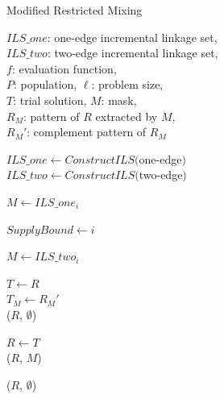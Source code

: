 \documentclass{sig-alternate-05-2015}
\begin{document}
\begin{algorithm}[th!]
\caption{Modified Restricted Mixing}\label{algo_disjdecomp}

$ILS\_one$: one-edge incremental linkage set,\\
$ILS\_two$: two-edge incremental linkage set,\\
$f$: evaluation function, \\
$P$: population, $\ell$: problem size, \\
$T$: trial solution, $M$: mask, \\
${R_M}$: pattern of $R$ extracted by $M$, \\
${R_M}'$: complement pattern of ${R_M}$



\BlankLine
$ILS\_one  \leftarrow ConstructILS($one-edge$)$\\
$ILS\_two  \leftarrow ConstructILS($two-edge$)$
\BlankLine
{} {
    $M \leftarrow ILS\_one_i$ \\
     {
        $ SupplyBound \leftarrow i$
       
    }
}

\BlankLine
{} {

    $M \leftarrow ILS\_two_i$ \\

     {

        $T \leftarrow R$ \\
        $T_M \leftarrow {R_M}'$ \\

         {
            \Return ($R$, $\emptyset$) 
        }

         {
            $R \leftarrow T$ \\
            \Return ($R$, $M$)
        }
    }
}
\Return ($R$, $\emptyset$) 
\end{algorithm}


\end{document}
